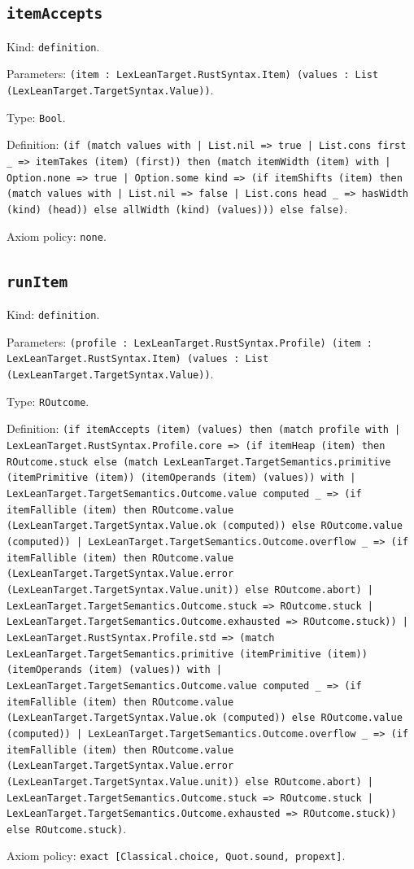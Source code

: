 \documentclass[11pt]{article}
\begin{document}
\subsection*{\texttt{itemAccepts}}
\noindent Kind: \texttt{definition}.\par
\noindent Parameters: \texttt{(item : LexLeanTarget.RustSyntax.Item) (values : List (LexLeanTarget.TargetSyntax.Value))}.\par
\noindent Type: \texttt{Bool}.\par
\noindent Definition: \texttt{(if (match values with | List.nil => true | List.cons first \_ => itemTakes (item) (first)) then (match itemWidth (item) with | Option.none => true | Option.some kind => (if itemShifts (item) then (match values with | List.nil => false | List.cons head \_ => hasWidth (kind) (head)) else allWidth (kind) (values))) else false)}.\par
\noindent Axiom policy: \texttt{none}.\par
\subsection*{\texttt{runItem}}
\noindent Kind: \texttt{definition}.\par
\noindent Parameters: \texttt{(profile : LexLeanTarget.RustSyntax.Profile) (item : LexLeanTarget.RustSyntax.Item) (values : List (LexLeanTarget.TargetSyntax.Value))}.\par
\noindent Type: \texttt{ROutcome}.\par
\noindent Definition: \texttt{(if itemAccepts (item) (values) then (match profile with | LexLeanTarget.RustSyntax.Profile.core => (if itemHeap (item) then ROutcome.stuck else (match LexLeanTarget.TargetSemantics.primitive (itemPrimitive (item)) (itemOperands (item) (values)) with | LexLeanTarget.TargetSemantics.Outcome.value computed \_ => (if itemFallible (item) then ROutcome.value (LexLeanTarget.TargetSyntax.Value.ok (computed)) else ROutcome.value (computed)) | LexLeanTarget.TargetSemantics.Outcome.overflow \_ => (if itemFallible (item) then ROutcome.value (LexLeanTarget.TargetSyntax.Value.error (LexLeanTarget.TargetSyntax.Value.unit)) else ROutcome.abort) | LexLeanTarget.TargetSemantics.Outcome.stuck => ROutcome.stuck | LexLeanTarget.TargetSemantics.Outcome.exhausted => ROutcome.stuck)) | LexLeanTarget.RustSyntax.Profile.std => (match LexLeanTarget.TargetSemantics.primitive (itemPrimitive (item)) (itemOperands (item) (values)) with | LexLeanTarget.TargetSemantics.Outcome.value computed \_ => (if itemFallible (item) then ROutcome.value (LexLeanTarget.TargetSyntax.Value.ok (computed)) else ROutcome.value (computed)) | LexLeanTarget.TargetSemantics.Outcome.overflow \_ => (if itemFallible (item) then ROutcome.value (LexLeanTarget.TargetSyntax.Value.error (LexLeanTarget.TargetSyntax.Value.unit)) else ROutcome.abort) | LexLeanTarget.TargetSemantics.Outcome.stuck => ROutcome.stuck | LexLeanTarget.TargetSemantics.Outcome.exhausted => ROutcome.stuck)) else ROutcome.stuck)}.\par
\noindent Axiom policy: \texttt{exact [Classical.choice, Quot.sound, propext]}.\par
\end{document}
